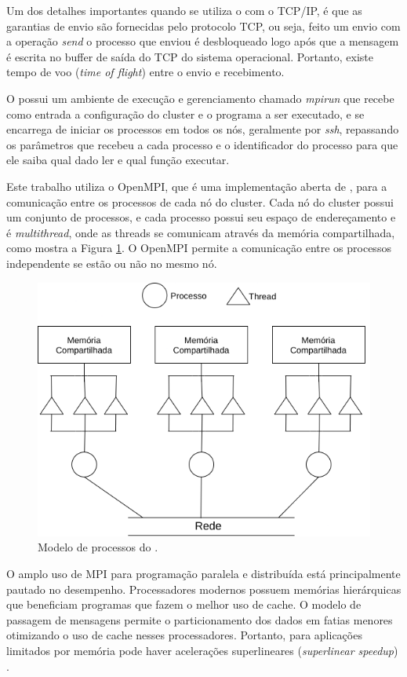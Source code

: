 Um dos detalhes importantes quando se utiliza o \mpi com o TCP/IP, é que as
garantias de envio são fornecidas pelo protocolo TCP, ou seja, feito um envio
com a operação \emph{send} o processo que enviou é desbloqueado logo após que a
mensagem é escrita no buffer de saída do TCP do sistema operacional. Portanto,
existe tempo de voo (\emph{time of flight}) entre o envio e recebimento.

O \mpi possui um ambiente de execução e gerenciamento chamado \emph{mpirun} que
recebe como entrada a configuração do cluster e o programa a ser executado, e se
encarrega de iniciar os processos em todos os nós, geralmente por \emph{ssh},
repassando os parâmetros que recebeu a cada processo e o identificador do
processo para que ele saiba qual dado ler e qual função executar.

Este trabalho utiliza o OpenMPI, que é uma implementação aberta de \mpi, para a
comunicação entre os processos de cada nó do cluster. Cada nó do cluster possui um
conjunto de processos, e cada processo possui seu espaço de endereçamento e é
\emph{multithread}, onde as threads se comunicam através da memória
compartilhada, como mostra a Figura \ref{fig:mpi-modelo}. O OpenMPI permite a
comunicação entre os processos independente se estão ou não no mesmo nó.

\begin{figure}[htb]
  \centerline{
    \includegraphics[width=0.55\linewidth,page=1]{figures/mpi-modelo-iot.png}
  }
  \caption{Modelo de processos do \mfog.}
  \label{fig:mpi-modelo}
\end{figure}

O amplo uso de MPI para programação paralela e distribuída está principalmente pautado no
desempenho. Processadores modernos possuem memórias hierárquicas que beneficiam
programas que fazem o melhor uso de cache. O modelo de passagem de mensagens
permite o particionamento dos dados em fatias menores otimizando o uso de cache
nesses processadores. Portanto, para aplicações limitados por memória pode haver
acelerações superlineares (\emph{superlinear speedup}) \cite{mpi-book}.

